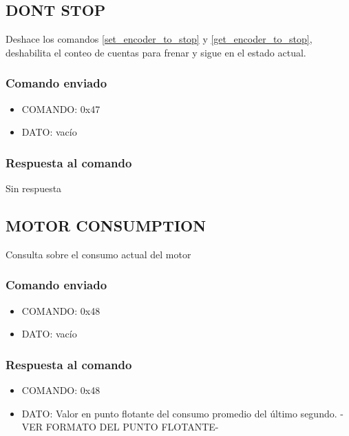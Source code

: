 \documentclass[a4paper,10pt]{article}
\begin{document}
\subsection{DONT STOP}
\label{dont_stop}

Deshace los comandos \ref{set_encoder_to_stop} y \ref{get_encoder_to_stop}, deshabilita el conteo de cuentas para frenar y sigue en el estado actual.

\subsubsection*{Comando enviado}

\begin{itemize}
	\item{COMANDO:} 0x47
	\item{DATO:} vac\'io
\end{itemize}

\subsubsection*{Respuesta al comando}

Sin respuesta

\subsection{MOTOR CONSUMPTION}
\label{motor_consumption}

Consulta sobre el consumo actual del motor

\subsubsection*{Comando enviado}

\begin{itemize}
	\item{COMANDO:} 0x48
	\item{DATO:} vac\'io
\end{itemize}

\subsubsection*{Respuesta al comando}

\begin{itemize}
	\item{COMANDO:} 0x48
	\item{DATO:} Valor en punto flotante del consumo promedio del \'ultimo segundo. -VER FORMATO DEL PUNTO FLOTANTE-
\end{itemize}
\end{document}
